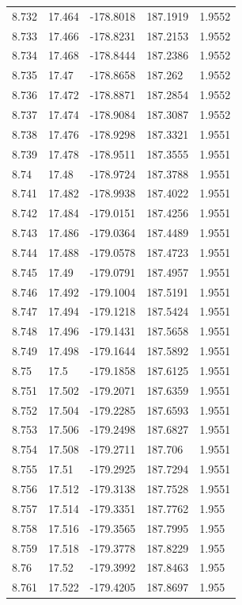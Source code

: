 \begin{tabular}{lllll}
8.732 & 17.464 & -178.8018 & 187.1919 & 1.9552 \\
8.733 & 17.466 & -178.8231 & 187.2153 & 1.9552 \\
8.734 & 17.468 & -178.8444 & 187.2386 & 1.9552 \\
8.735 & 17.47 & -178.8658 & 187.262 & 1.9552 \\
8.736 & 17.472 & -178.8871 & 187.2854 & 1.9552 \\
8.737 & 17.474 & -178.9084 & 187.3087 & 1.9552 \\
8.738 & 17.476 & -178.9298 & 187.3321 & 1.9551 \\
8.739 & 17.478 & -178.9511 & 187.3555 & 1.9551 \\
8.74 & 17.48 & -178.9724 & 187.3788 & 1.9551 \\
8.741 & 17.482 & -178.9938 & 187.4022 & 1.9551 \\
8.742 & 17.484 & -179.0151 & 187.4256 & 1.9551 \\
8.743 & 17.486 & -179.0364 & 187.4489 & 1.9551 \\
8.744 & 17.488 & -179.0578 & 187.4723 & 1.9551 \\
8.745 & 17.49 & -179.0791 & 187.4957 & 1.9551 \\
8.746 & 17.492 & -179.1004 & 187.5191 & 1.9551 \\
8.747 & 17.494 & -179.1218 & 187.5424 & 1.9551 \\
8.748 & 17.496 & -179.1431 & 187.5658 & 1.9551 \\
8.749 & 17.498 & -179.1644 & 187.5892 & 1.9551 \\
8.75 & 17.5 & -179.1858 & 187.6125 & 1.9551 \\
8.751 & 17.502 & -179.2071 & 187.6359 & 1.9551 \\
8.752 & 17.504 & -179.2285 & 187.6593 & 1.9551 \\
8.753 & 17.506 & -179.2498 & 187.6827 & 1.9551 \\
8.754 & 17.508 & -179.2711 & 187.706 & 1.9551 \\
8.755 & 17.51 & -179.2925 & 187.7294 & 1.9551 \\
8.756 & 17.512 & -179.3138 & 187.7528 & 1.9551 \\
8.757 & 17.514 & -179.3351 & 187.7762 & 1.955 \\
8.758 & 17.516 & -179.3565 & 187.7995 & 1.955 \\
8.759 & 17.518 & -179.3778 & 187.8229 & 1.955 \\
8.76 & 17.52 & -179.3992 & 187.8463 & 1.955 \\
8.761 & 17.522 & -179.4205 & 187.8697 & 1.955 \\

\end{tabular}
